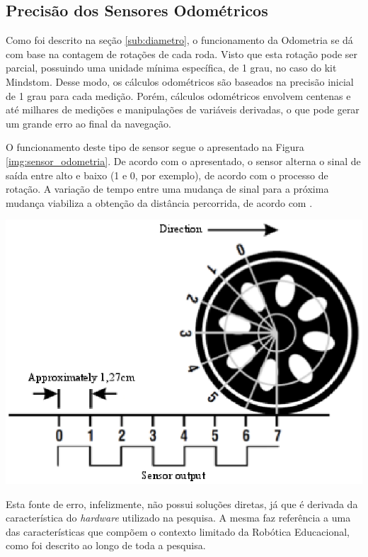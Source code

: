 \subsection{Precisão dos Sensores Odométricos}
\label{sub:precisao_sensores}

  Como foi descrito na seção \ref{sub:diametro}, o funcionamento da Odometria se dá com base na contagem de rotações de cada roda.
  Visto que esta rotação pode ser parcial, possuindo uma unidade mínima específica, de 1 grau, no caso do kit Mindstom. Desse modo,
  os cálculos odométricos são baseados na precisão inicial de 1 grau para cada medição. Porém, cálculos odométricos envolvem centenas e até
  milhares de medições e manipulações de variáveis derivadas, o que pode gerar um grande erro ao final da navegação.

  O funcionamento deste tipo de sensor segue o apresentado na Figura \ref{img:sensor_odometria}. De acordo com o apresentado, o sensor
   alterna o sinal de saída entre alto e baixo (1 e 0, por exemplo), de acordo com o processo de rotação. A variação de tempo entre
   uma mudança de sinal para a próxima mudança viabiliza a obtenção da distância percorrida, de acordo com \cite{odometria}.

   {\centering
   \includegraphics[scale=0.9]{figuras/sensor_odometria.eps}
   \label{img:sensor_odometria}
   \par}

  Esta fonte de erro, infelizmente, não possui soluções diretas, já que é derivada da característica do \textit{hardware} utilizado
  na pesquisa. A mesma faz referência a uma das características que compõem o contexto limitado da Robótica Educacional,
  como foi descrito ao longo de toda a pesquisa.

